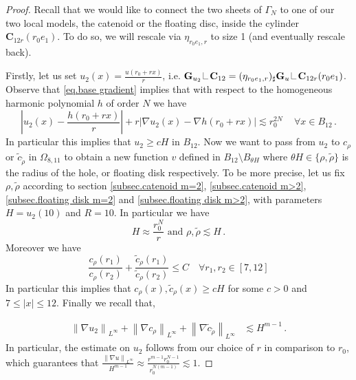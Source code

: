 \documentclass[reqno]{amsart}
\theoremstyle{definition}
\theoremstyle{remark}
\numberwithin{equation}{section}
\newcommand{\norm}[1]{\left\lVert#1\right\rVert}
\newcommand\res{\mathop{\hbox{\vrule height 7pt width .3pt depth 0pt\vrule height .3pt width 5pt depth 0pt}}\nolimits}
\newcommand{\bC}{\mathbf{C}} %
\newcommand{\bG}{\mathbf{G}} %
\begin{document}
\begin{proof}
Recall that we would like to connect the two sheets of $\Gamma_N$  to one of our two local models, the catenoid or the floating disc, inside the cylinder $\bC_{12 r}(r_0 e_1)$. To do so, we will rescale via $\eta_{r_0e_1,r}$ to size 1  (and eventually rescale back).


Firstly, let us set $u_2(x)= \frac{u(r_0+ rx)}{r}$, i.e. $\bG_{u_2}\res \bC_{12} = (\eta_{r_0 e_1, r})_\sharp \bG_{u}\res \bC_{12 r}(r_0 e_1)$.
Observe that \eqref{eq.base gradient} implies that with respect to the homogeneous harmonic polynomial $h$ of order $N$ we have
\begin{equation}\label{eq.base gradient-rescaled}
    \left|u_2(x)- \frac{h(r_0+rx)}{r}\right|+ r|\nabla u_2(x) - \nabla h(r_0+rx)|\lesssim r_0^{2N}\, \quad \forall x \in B_{12}\,.
\end{equation}
In particular this implies that  $u_2 \ge c H$ in $B_{12}$. Now we want to pass from $u_2$ to $c_\rho$ or $\tilde{c}_{\tilde{\rho}}$ in $\Omega_{8,11}$ to obtain a new function $v$ defined in $B_{12}\setminus B_{\theta H}$ where $\theta H\in \{\rho, \tilde{\rho}\}$ is the radius of the hole, or floating disk respectively. 
To be more precise, 
let us fix $\rho, \tilde{\rho}$ according to section \ref{subsec.catenoid m=2}, \ref{subsec.catenoid m>2}, \ref{subsec.floating disk m=2} and \ref{subsec.floating disk m>2}, with parameters $H=u_2(10)$ and $R=10$. In particular we have 
\[ H \approx \frac{r_0^N}{r} \text{ and } \rho,\tilde{\rho} \lesssim  H\,.\]
Moreover we have 
\[ \frac{c_\rho(r_1)}{c_\rho(r_2)}+ \frac{\tilde{c}_\rho(r_1)}{\tilde{c}_\rho(r_2)} \le C \quad \forall r_1,r_2 \in [7,12] \]
In particular this implies that $c_\rho(x), \tilde{c}_\rho(x) \ge c H$  for some $c>0$ and $7\le |x|\le 12$.
Finally we recall that,

\begin{align*}
    \norm{\nabla u_2}_{L^\infty}+\norm{\nabla c_{\rho}}_{L^\infty}+\norm{\nabla\tilde{c}_{\tilde{\rho}}}_{L^\infty} &\lesssim H^{m-1}\,.
\end{align*}
In particular, the estimate on $u_2$ follows from our choice of $r$ in comparison to $r_0$, which guarantees that $\frac{\norm{\nabla u}_{L^\infty}}{H^{m-1}} \approx \frac{r^{m-1}r_0^{N-1}}{r_0^{N(m-1)}}\lesssim 1$.



\end{proof}
\end{document}
